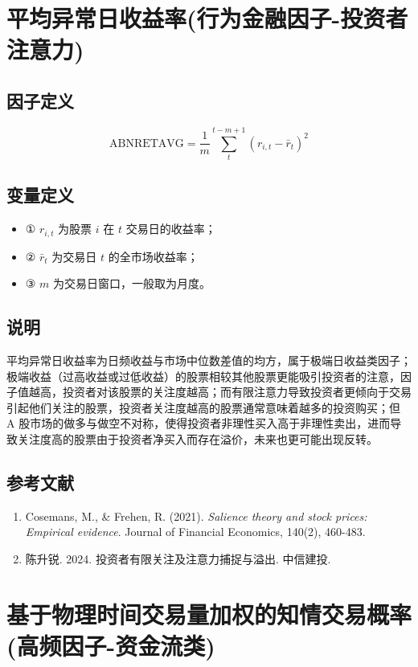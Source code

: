 \documentclass{article}
\begin{document}
\section{平均异常日收益率(行为金融因子-投资者注意力)}

\subsection{因子定义}
\begin{equation}
    \mathrm{ABNRETAVG} = \frac{1}{m} \sum_{t}^{t-m+1} (r_{i,t} - \bar{r}_t)^2
\end{equation}

\subsection{变量定义}
\begin{itemize}
    \item ① \( r_{i,t} \) 为股票 \( i \) 在 \( t \) 交易日的收益率；
    \item ② \( \bar{r}_t \) 为交易日 \( t \) 的全市场收益率；
    \item ③ \( m \) 为交易日窗口，一般取为月度。
\end{itemize}

\subsection{说明}
平均异常日收益率为日频收益与市场中位数差值的均方，属于极端日收益类因子；极端收益（过高收益或过低收益）的股票相较其他股票更能吸引投资者的注意，因子值越高，投资者对该股票的关注度越高；而有限注意力导致投资者更倾向于交易引起他们关注的股票，投资者关注度越高的股票通常意味着越多的投资购买；但 A 股市场的做多与做空不对称，使得投资者非理性买入高于非理性卖出，进而导致关注度高的股票由于投资者净买入而存在溢价，未来也更可能出现反转。

\subsection{参考文献}
\begin{enumerate}
    \item Cosemans, M., \& Frehen, R. (2021). \textit{Salience theory and stock prices: Empirical evidence}. Journal of Financial Economics, 140(2), 460-483.
    \item 陈升锐. 2024. 投资者有限关注及注意力捕捉与溢出. 中信建投.
\end{enumerate}

\section{基于物理时间交易量加权的知情交易概率(高频因子-资金流类)}
\end{document}
